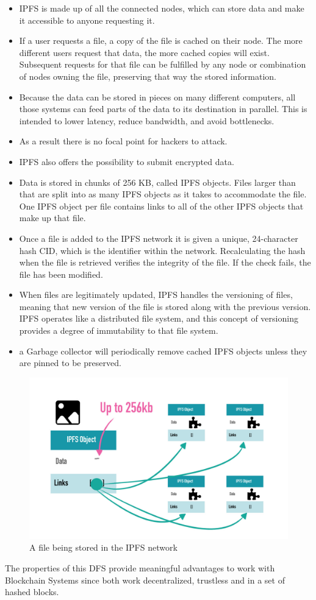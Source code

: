 \begin{itemize}
    \item  \ac{IPFS} is made up of all the connected nodes, which can store data and make it accessible to anyone requesting it.
    \item If a user requests a file, a copy of the file is cached on their node. The more different users request that data, the more cached copies will exist. Subsequent requests for that file can be fulfilled by any node or combination of nodes owning the file, preserving that way the stored information.
    \item  Because the data can be stored in pieces on many different computers, all those systems can feed parts of the data to its destination in parallel. This is intended to lower latency, reduce bandwidth, and avoid bottlenecks.
    \item As a result there is no focal point for hackers to attack.
    \item \ac{IPFS} also offers the possibility to submit encrypted data.
    \item Data is stored in chunks of 256 \ac{KB}, called \ac{IPFS} objects. Files larger than that are split into as many IPFS objects as it takes to accommodate the file. One IPFS object per file contains links to all of the other IPFS objects that make up that file.
    \item Once a file is added to the \ac{IPFS} network it is given a unique, 24-character hash \ac{CID}, which is the identifier within the network. Recalculating the hash when the file is retrieved verifies the integrity of the file. If the check fails, the file has been modified. 
    \item When files are legitimately updated, IPFS handles the versioning of files, meaning that new version of the file is stored along with the previous version. IPFS operates like a distributed file system, and this concept of versioning provides a degree of immutability to that file system.
    \item a Garbage collector will periodically remove cached \ac{IPFS} objects unless they are pinned to be preserved.
\end{itemize}

\begin{figure}[!h]
    \centering
    \includegraphics[width=15cm]{img/IPFSExample.png}
    \caption{A file being stored in the \ac{IPFS} network}
    \label{fig:IPFSExample}
\end{figure}


The properties of this \ac{DFS} provide meaningful advantages to work with Blockchain Systems since both work decentralized, trustless and in a set of hashed blocks.